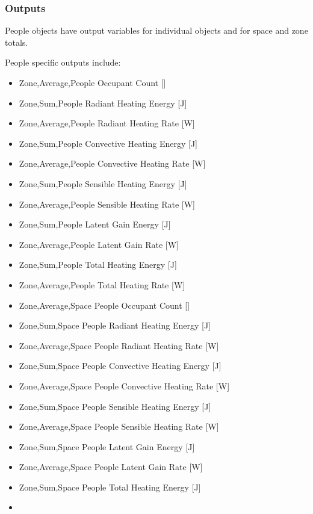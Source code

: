 \subsubsection{Outputs}\label{outputs-017}

People objects have output variables for individual objects and for space and zone totals.

People specific outputs include:

\begin{itemize}
\item
  Zone,Average,People Occupant Count {[]}
\item
  Zone,Sum,People Radiant Heating Energy {[}J{]}
\item
  Zone,Average,People Radiant Heating Rate {[}W{]}
\item
  Zone,Sum,People Convective Heating Energy {[}J{]}
\item
  Zone,Average,People Convective Heating Rate {[}W{]}
\item
  Zone,Sum,People Sensible Heating Energy {[}J{]}
\item
  Zone,Average,People Sensible Heating Rate {[}W{]}
\item
  Zone,Sum,People Latent Gain Energy {[}J{]}
\item
  Zone,Average,People Latent Gain Rate {[}W{]}
\item
  Zone,Sum,People Total Heating Energy {[}J{]}
\item
  Zone,Average,People Total Heating Rate {[}W{]}
\item
  Zone,Average,Space People Occupant Count {[]}
\item
  Zone,Sum,Space People Radiant Heating Energy {[}J{]}
\item
  Zone,Average,Space People Radiant Heating Rate {[}W{]}
\item
  Zone,Sum,Space People Convective Heating Energy {[}J{]}
\item
  Zone,Average,Space People Convective Heating Rate {[}W{]}
\item
  Zone,Sum,Space People Sensible Heating Energy {[}J{]}
\item
  Zone,Average,Space People Sensible Heating Rate {[}W{]}
\item
  Zone,Sum,Space People Latent Gain Energy {[}J{]}
\item
  Zone,Average,Space People Latent Gain Rate {[}W{]}
\item
  Zone,Sum,Space People Total Heating Energy {[}J{]}
\item

\end{itemize}
